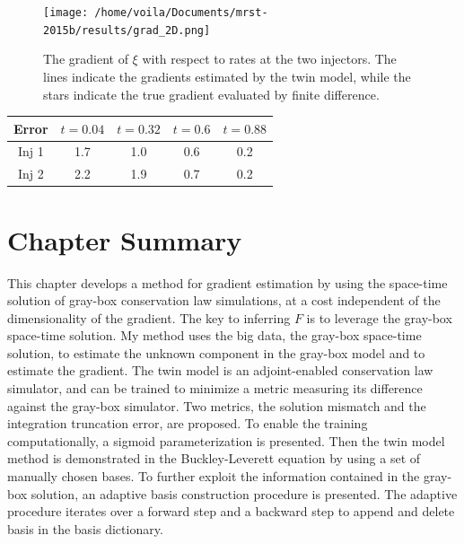 \begin{figure}[htbp]
    \begin{center}
        \texttt{[image: /home/voila/Documents/mrst-2015b/results/grad\_2D.png]}
        \caption{The gradient of $\xi$ with respect to rates at the two injectors.
                 The lines indicate the gradients estimated by the twin model, while
                 the stars indicate the true gradient evaluated by finite difference.}
        \label{fig: reservoir 3D gradient}
    \end{center}
\end{figure}

\begin{center}
    \begin{tabular}{|c|c|c|c|c|}
       \hline\hline
         Error & $t=0.04$ & $t=0.32$ & $t=0.6$ & $t=0.88$\\
       \hline
       Inj 1 & 1.7  & 1.0 & 0.6 & 0.2 \\
       \hline
       Inj 2 & 2.2 &  1.9 & 0.7 & 0.2 \\
       \hline\hline
    \end{tabular}
    \label{tab: reservoir 3D grad error}
\end{center}


\section{Chapter Summary}
\label{sec: chap 2 summary}
This chapter develops a method for gradient estimation by using the space-time solution of
gray-box conservation law simulations, at a cost independent of the dimensionality of the gradient.
The key to inferring $F$ is to leverage the gray-box space-time solution.
My method uses the big data, the gray-box space-time solution, to estimate the unknown 
component in the gray-box model and to estimate the gradient.
The twin model is an adjoint-enabled conservation law simulator, and can be trained 
to minimize a metric measuring its difference against the gray-box simulator.
Two metrics, the solution mismatch and the integration truncation error, are proposed.
To enable the training computationally, a sigmoid parameterization
is presented. 
Then the twin model method is demonstrated in the Buckley-Leverett equation
by using a set of manually chosen bases.
To further exploit the information contained in the
gray-box solution,
an adaptive basis construction procedure is presented. The adaptive 
procedure iterates over a forward step and a backward step to append and delete basis
in the basis dictionary.\\

